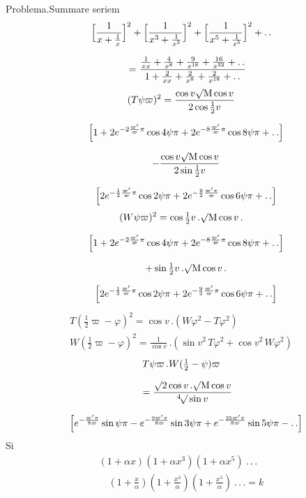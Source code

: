 \noindent Problema.\quad Summare seriem
\[
\begin{gathered}\Bigl[\frac{1}{x+\frac1x}\Bigr]^{2}
+\Bigl[\frac{1}{x^{3}+\frac1{x^{3}}}\Bigr]^{2}
+\Bigl[\frac{1}{x^{5}+\frac1{x^{5}}}\Bigr]^{2}+ .\,.
\\[7pt]\quad{}=\frac{\frac1{xx}+\frac4{x^{8}}+\frac9{x^{18}}+\frac{16}{x^{32}}+ .\,.}
{1+\frac2{xx}+\frac2{x^{8}}+\frac2{x^{18}}+ .\,.}\end{gathered}
\]
\[
\begin{gathered}
(T\psi\varpi)^{2}
=\frac{\cos v\surd\mathrm{M}\cos v}{2\cos\frac12v}
\\[7pt]\quad{}\Bigl[1+2e^{-2\frac{\varpi'}{\varpi}\pi}\cos4\psi\pi
+2e^{-8\frac{\varpi'}{\varpi}\pi}\cos8\psi\pi+ .\,.\Bigr]
\\[7pt]
\quad-\frac{\cos v\surd\mathrm{M}\cos v}{2\sin\frac12v}
\\[7pt]\quad{}\Bigl[2e^{-\frac12\frac{\varpi'}{\varpi}\pi}\cos2\psi\pi
+2e^{-\frac92\frac{\varpi'\pi}{\varpi}}\cos6\psi\pi+ .\,.\Bigr]
\end{gathered}
\]
\[
\begin{gathered}
(W\psi\varpi)^{2}
=\cos\tfrac12v\,.\surd\mathrm{M}\cos v\,.
\\[7pt]\quad{}\Bigl[1+2e^{-2\frac{\varpi'}{\varpi}\pi}\cos4\psi\pi
+2e^{-8\frac{\varpi'}{\varpi}\pi}\cos8\psi\pi+ .\,.\Bigr]
\\[7pt]
\quad+\sin\tfrac12v\,.\surd\mathrm{M}\cos v\,.
\\[7pt]\quad{}\Bigl[2e^{-\frac12\frac{\varpi'}{\varpi}\pi}\cos2\psi\pi
+2e^{-\frac92\frac{\varpi'}{\varpi}\pi}\cos6\psi\pi+ .\,.\Bigr]
\end{gathered}
\]
\[
\begin{gathered}
T(\tfrac12\varpi-\varphi)^{2}=\cos v\,.(W\varphi^{2}-T\varphi^{2})
\\[7pt]
W(\tfrac12\varpi-\varphi)^{2}=\frac1{\cos v}\,.(\sin v^{2}\,T\varphi^{2}+\cos v^{2}\,W\varphi^{2})
\end{gathered}
\]
\[
\begin{gathered}T\psi\varpi\,.W(\tfrac12-\psi)\varpi
\\[7pt]\quad{}=\frac{\surd2\cos v\,.\surd\mathrm{M}\cos v}{{}^{4}\!\surd\sin v}
\\[7pt]\quad{}\Bigl[e^{-\frac{\varpi'\pi}{8\varpi}}\sin\psi\pi
-e^{-\frac{9\varpi'\pi}{8\varpi}}\sin3\psi\pi
+e^{-\frac{25\varpi'\pi}{8\varpi}}\sin5\psi\pi- .\,.\Bigr]\end{gathered}
\]
\noindent Si
\[
\begin{gathered}(1+\alpha x)(1+\alpha x^{3})(1+\alpha x^{5})\ .\,.\,.
\\[7pt]\quad{}(1+\tfrac{x}{\alpha})(1+\tfrac{x^{3}}{\alpha})(1+\tfrac{x^{5}}{\alpha})\ .\,.\,.=k\end{gathered}
\]
